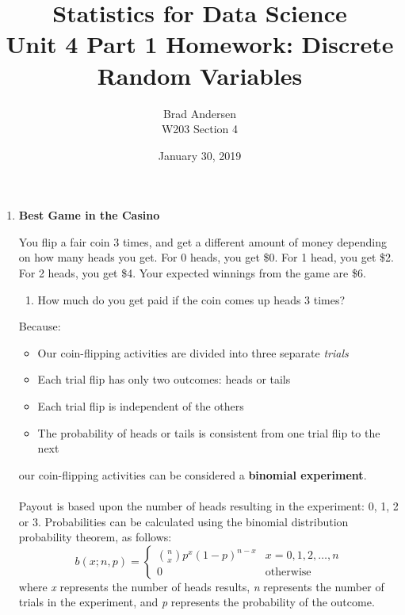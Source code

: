 \documentclass[12pt,a4paper]{article}
\title{Statistics for Data Science \\
    Unit 4 Part 1 Homework: Discrete Random Variables}
\author{Brad Andersen \\
    W203 Section 4}
\date{January 30, 2019}
\numberwithin{equation}{subsection}
\begin{document}
\maketitle

\begin{enumerate}


\item \textbf{Best Game in the Casino}

You flip a fair coin 3 times, and get a different amount of money depending on how many heads you get. For 0 heads, you get \$0. For 1 head, you get \$2. For 2 heads, you get \$4. Your expected winnings from the game are \$6. 

\begin{enumerate}
\item How much do you get paid if the coin comes up heads 3 times?
\end{enumerate}
Because:
\begin{itemize}
    \item Our coin-flipping activities are divided into three separate \textit{trials}
    \item Each trial flip has only two outcomes: heads or tails
    \item Each trial flip is independent of the others
    \item The probability of heads or tails is consistent from one trial flip to the next
\end{itemize}
our coin-flipping activities can be considered a \textbf{binomial experiment}.\\ \\
Payout is based upon the number of heads resulting in the experiment: 0, 1, 2 or 3.  Probabilities can be calculated using the binomial distribution probability theorem, as follows:
\begin{equation*}
    b(x; n, p) =
    \begin{cases}
    \binom{n}{x}p^{x}(1 - p)^{n - x} & x = 0, 1, 2, \dots, n\\
    0 & \text{otherwise}
    \end{cases}
\end{equation*}
where \textit{x} represents the number of heads results, \textit{n} represents the number of trials in the experiment, and \textit{p} represents the probability of the outcome. \\ \\

\end{enumerate}
\end{document}
